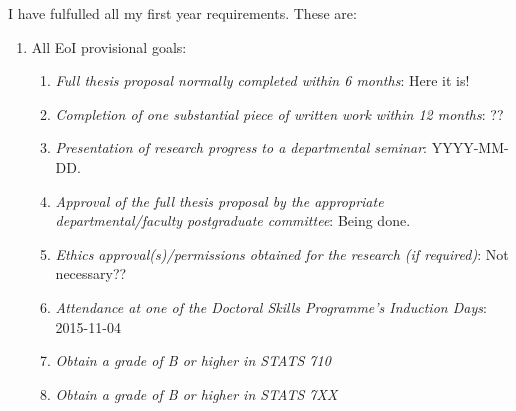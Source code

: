 \documentclass[12pt,a4paper]{article}
\begin{document}
I have fulfulled all my first year requirements.
These are:
\begin{enumerate}

\item
All EoI provisional goals:
\begin{enumerate}

\item
\textit{Full thesis proposal normally completed within 6 months}:
Here it is!

\item
\textit{Completion of one substantial piece of written work within
12 months}: ??


\item
\textit{Presentation of research progress to a departmental seminar}:
YYYY-MM-DD.

\item
\textit{Approval of the full thesis proposal by the appropriate
departmental/faculty postgraduate committee}:
Being done.

\item
\textit{Ethics approval(s)/permissions obtained for the research
(if required)}:
Not necessary??

\item
\textit{Attendance at one of the Doctoral Skills Programme's
Induction Days}:
2015-11-04

\item
\textit{Obtain a grade of B or higher in STATS 710}

\item
\textit{Obtain a grade of B or higher in STATS 7XX}

\end{enumerate}














\end{enumerate}
\end{document}
